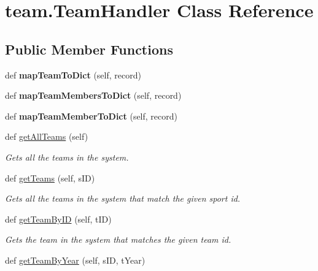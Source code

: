 \hypertarget{classteam_1_1_team_handler}{}\section{team.\+Team\+Handler Class Reference}
\label{classteam_1_1_team_handler}
\subsection*{Public Member Functions}
\begin{DoxyCompactItemize}
\item 
\mbox{\label{classteam_1_1_team_handler_a4f1381886cba417e92c8d36cfa86682f}} 
def {\bfseries map\+Team\+To\+Dict} (self, record)
\item 
\mbox{\label{classteam_1_1_team_handler_a28fe3f31a3f3e5e22fa058b862fd1df1}} 
def {\bfseries map\+Team\+Members\+To\+Dict} (self, record)
\item 
\mbox{\label{classteam_1_1_team_handler_a365472aad2e49afcf5113fc9b2507eda}} 
def {\bfseries map\+Team\+Member\+To\+Dict} (self, record)
\item 
def \hyperlink{classteam_1_1_team_handler_a98e52997bda45bbd226d229bcb1a64bc}{get\+All\+Teams} (self)
\begin{DoxyCompactList}\small\item\em Gets all the teams in the system. \end{DoxyCompactList}\item 
def \hyperlink{classteam_1_1_team_handler_a38b28e9dfb4201487c157ed15dca73f3}{get\+Teams} (self, s\+ID)
\begin{DoxyCompactList}\small\item\em Gets all the teams in the system that match the given sport id. \end{DoxyCompactList}\item 
def \hyperlink{classteam_1_1_team_handler_a74614e57b5de837cd73ebebb2fd68d7e}{get\+Team\+By\+ID} (self, t\+ID)
\begin{DoxyCompactList}\small\item\em Gets the team in the system that matches the given team id. \end{DoxyCompactList}\item 
def \hyperlink{classteam_1_1_team_handler_a130f48624c706c192f45929e26df86e4}{get\+Team\+By\+Year} (self, s\+ID, t\+Year)

\end{DoxyCompactItemize}

